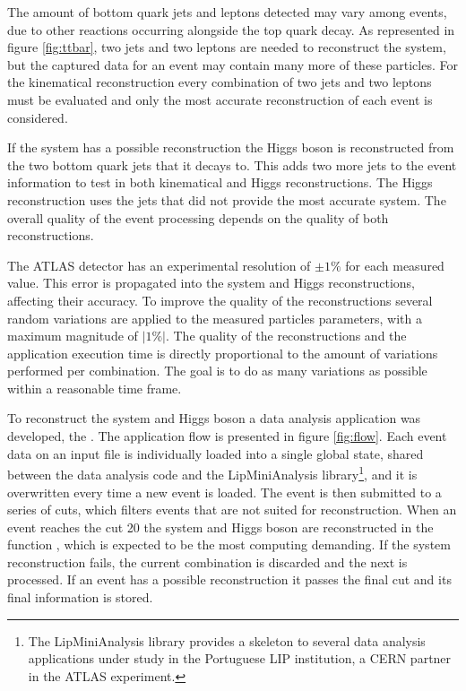 The amount of bottom quark jets and leptons detected may vary among events, due to other reactions occurring alongside the top quark decay. As represented in figure \ref{fig:ttbar}, two jets and two leptons are needed to reconstruct the \ttbar system, but the captured data for an event may contain many more of these particles. For the kinematical reconstruction every combination of two jets and two leptons must be evaluated and only the most accurate reconstruction of each event is considered.

If the \ttbar system has a possible reconstruction the Higgs boson is reconstructed from the two bottom quark jets that it decays to. This adds two more jets to the event information to test in both kinematical and Higgs reconstructions. The Higgs reconstruction uses the jets that did not provide the most accurate \ttbar system. The overall quality of the event processing depends on the quality of both reconstructions.

The ATLAS detector has an experimental resolution of $\pm1\%$ for each measured value. This error is propagated into the \ttbar system and Higgs reconstructions, affecting their accuracy. To improve the quality of the reconstructions several random variations are applied to the measured particles parameters, with a maximum magnitude of $|1\%|$. The quality of the reconstructions and the application execution time is directly proportional to the amount of variations performed per combination. The goal is to do as many variations as possible within a reasonable time frame.

To reconstruct the \ttbar system and Higgs boson a data analysis application was developed, the \tth. The application flow is presented in figure \ref{fig:flow}. Each event data on an input file is individually loaded into a single global state, shared between the data analysis code and the LipMiniAnalysis library\footnote{The LipMiniAnalysis library provides a skeleton to several data analysis applications under study in the Portuguese LIP institution, a CERN partner in the ATLAS experiment.}, and it is overwritten every time a new event is loaded. The event is then submitted to a series of cuts, which filters events that are not suited for reconstruction. When an event reaches the cut 20 the \ttbar system and Higgs boson are reconstructed in the function \ttDilepKinFit, which is expected to be the most computing demanding. If the \ttbar system reconstruction fails, the current combination is discarded and the next is processed. If an event has a possible reconstruction it passes the final cut and its final information is stored.

